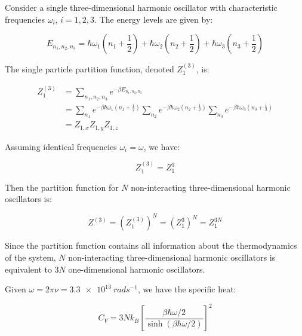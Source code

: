 \documentclass[12pt]{article}
\begin{document}

Consider a single three-dimensional harmonic oscillator with characteristic frequencies $\omega_{i}$, $i = 1, 2, 3$. The energy levels are given by:

\begin{equation}
    E_{n_{1}, n_{2}, n_{3}} = \hbar \omega_{1} \left( n_{1} + \frac{1}{2} \right) + \hbar \omega_{2} \left( n_{2} + \frac{1}{2} \right) + \hbar \omega_{3} \left( n_{3} + \frac{1}{2} \right)
\end{equation}

The single particle partition function, denoted $Z_{1}^{(3)}$, is:

\begin{equation}
    \begin{split}
        Z_{1}^{(3)} &= \sum_{n_{1}, n_{2}, n_{3}} e^{-\beta E_{n_{1}, n_{2}, n_{3}}} \\
        &= \sum_{n_{1}} e^{-\beta \hbar \omega_{1} \left( n_{1} + \frac{1}{2} \right)} \sum_{n_{2}} e^{-\beta \hbar \omega_{2} \left( n_{2} + \frac{1}{2} \right)} \sum_{n_{3}} e^{-\beta \hbar \omega_{3} \left( n_{3} + \frac{1}{2} \right)} \\
        &= Z_{1, x} Z_{1, y} Z_{1, z}
    \end{split}
\end{equation}

Assuming identical frequencies $\omega_{i} = \omega$, we have:

\begin{equation}
    Z_{1}^{(3)} = Z_{1}^{3}
\end{equation}

Then the partition function for $N$ non-interacting three-dimensional harmonic oscillators is:

\begin{equation}
    Z^{(3)} = (Z_{1}^{(3)})^{N} = (Z_{1}^{3})^{N} = Z_{1}^{3N}
\end{equation}

Since the partition function contains all information about the thermodynamics of the system, $N$ non-interacting three-dimensional harmonic oscillators is equivalent to $3N$ one-dimensional harmonic oscillators.

Given $\omega = 2\pi \nu = \qty{3.3e13}{rad s^{-1}}$, we have the specific heat:

\begin{equation}
    C_{V} = 3N k_{B} \left[ \frac{\beta \hbar \omega/2}{\sinh\left( \beta \hbar \omega / 2 \right)} \right]^{2}
\end{equation}
\end{document}
